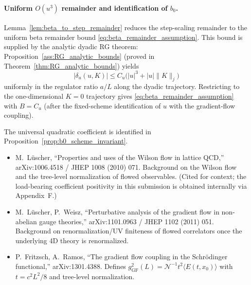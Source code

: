 \paragraph{Uniform $O(u^3)$ remainder and identification of $b_0$.}
Lemma~\ref{lem:beta_to_step_remainder} reduces the step-scaling remainder to the uniform beta remainder bound \eqref{eq:beta_remainder_assumption}.
This bound is supplied by the analytic dyadic RG theorem:
Proposition~\ref{ass:RG_analytic_bounds} (proved in Theorem~\ref{thm:RG_analytic_bounds}) yields
\[
|\delta_u(u,K)|\le C_u\bigl(|u|^3+|u|\|K\|_j\bigr)
\]
uniformly in the regulator ratio $a/L$ along the dyadic trajectory.
Restricting to the one-dimensional $K=0$ trajectory gives \eqref{eq:beta_remainder_assumption} with $B=C_u$
(after the fixed-scheme identification of $u$ with the gradient-flow coupling).

The universal quadratic coefficient is identified in Proposition~\ref{prop:b0_scheme_invariant}.


\begin{itemize}
\item M.~L\"uscher, ``Properties and uses of the Wilson flow in lattice QCD,'' arXiv:1006.4518 / JHEP 1008 (2010) 071.\newline
Background on the Wilson flow and the tree-level normalization of flowed observables. (Cited for context; the load-bearing coefficient positivity in this submission is obtained internally via Appendix~F.)

\item M.~L\"uscher, P.~Weisz, ``Perturbative analysis of the gradient flow in non-abelian gauge theories,'' arXiv:1101.0963 / JHEP 1102 (2011) 051.\newline
Background on renormalization/UV finiteness of flowed correlators once the underlying 4D theory is renormalized.

\item P.~Fritzsch, A.~Ramos, ``The gradient flow coupling in the Schr\"odinger functional,'' arXiv:1301.4388.
\newline Defines $g^2_{\mathrm{GF}}(L)=\mathcal N^{-1}t^2\langle E(t,x_0)\rangle$ with $t=c^2L^2/8$ and tree-level normalization.
\end{itemize}
